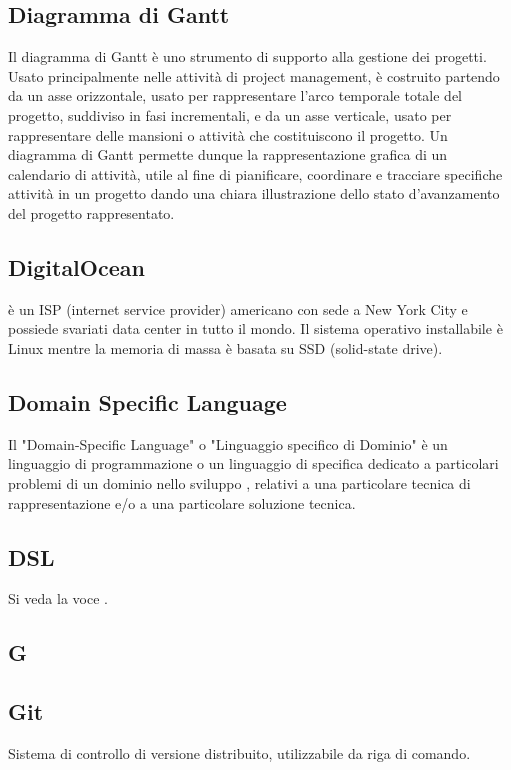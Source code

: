 \subsection*{Diagramma di Gantt}
Il diagramma di Gantt è uno strumento di supporto alla gestione dei
progetti. Usato principalmente nelle attività di project management, è costruito partendo da
un asse orizzontale, usato per rappresentare l'arco temporale totale del progetto, suddiviso
in fasi incrementali, e da un asse verticale, usato per rappresentare delle mansioni o attività
che costituiscono il progetto. Un diagramma di Gantt permette dunque la rappresentazione
grafica di un calendario di attività, utile al fine di pianificare, coordinare e tracciare specifiche
attività in un progetto dando una chiara illustrazione dello stato d'avanzamento del progetto
rappresentato.

\subsection*{DigitalOcean}
 è un ISP (internet service provider) americano con sede a New York City e possiede svariati data center in tutto il mondo. Il sistema operativo installabile è Linux mentre la memoria di massa è basata su SSD (solid-state drive).

\subsection*{Domain Specific Language}
Il "Domain-Specific Language" o "Linguaggio specifico di Dominio" è un linguaggio
di programmazione o un linguaggio di specifica dedicato a particolari
problemi di un dominio nello sviluppo , relativi a una particolare tecnica
di rappresentazione e/o a una particolare soluzione tecnica.

\subsection*{DSL}
Si veda la voce .

\newpage

\begin{center}
\Huge\section*{\uppercase{G}}
\end{center}

\subsection*{Git}
Sistema  di controllo di versione distribuito, utilizzabile da riga di comando.

